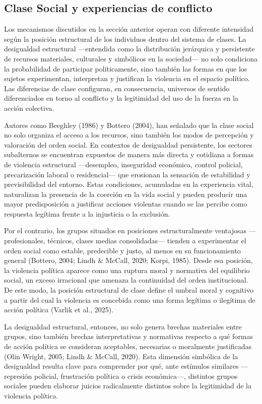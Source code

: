 \documentclass[
  13pt,
]{article}
\begin{document}
\subsection{Clase Social y experiencias de
conflicto}\label{clase-social-y-experiencias-de-conflicto}

Los mecanismos discutidos en la sección anterior operan con diferente
intensidad según la posición estructural de los individuos dentro del
sistema de clases. La desigualdad estructural ---entendida como la
distribución jerárquica y persistente de recursos materiales, culturales
y simbólicos en la sociedad--- no solo condiciona la probabilidad de
participar políticamente, sino también las formas en que los sujetos
experimentan, interpretan y justifican la violencia en el espacio
político. Las diferencias de clase configuran, en consecuencia,
universos de sentido diferenciados en torno al conflicto y la
legitimidad del uso de la fuerza en la acción colectiva.

Autores como Beeghley (1986) y Bottero (2004), han señalado que la clase
social no solo organiza el acceso a los recursos, sino también los modos
de percepción y valoración del orden social. En contextos de desigualdad
persistente, los sectores subalternos se encuentran expuestos de manera
más directa y cotidiana a formas de violencia estructural ---desempleo,
inseguridad económica, control policial, precarización laboral o
residencial--- que erosionan la sensación de estabilidad y
previsibilidad del entorno. Estas condiciones, acumuladas en la
experiencia vital, naturalizan la presencia de la coerción en la vida
social y pueden producir una mayor predisposición a justificar acciones
violentas cuando se las percibe como respuesta legítima frente a la
injusticia o la exclusión.

Por el contrario, los grupos situados en posiciones estructuralmente
ventajosas ---profesionales, técnicos, clases medias consolidadas---
tienden a experimentar el orden social como estable, predecible y justo,
al menos en su funcionamiento general (Bottero, 2004; Lindh \& McCall,
2020; Korpi, 1985). Desde esa posición, la violencia política aparece
como una ruptura moral y normativa del equilibrio social, un exceso
irracional que amenaza la continuidad del orden institucional. De este
modo, la posición estructural de clase define el umbral moral y
cognitivo a partir del cual la violencia es concebida como una forma
legítima o ilegítima de acción política (Varlik et al., 2025).

La desigualdad estructural, entonces, no solo genera brechas materiales
entre grupos, sino también brechas interpretativas y normativas respecto
a qué formas de acción política se consideran aceptables, necesarias o
moralmente justificadas (Olin Wright, 2005; Lindh \& McCall, 2020). Esta
dimensión simbólica de la desigualdad resulta clave para comprender por
qué, ante estímulos similares ---represión policial, frustración
política o crisis económica---, distintos grupos sociales pueden
elaborar juicios radicalmente distintos sobre la legitimidad de la
violencia política.
\end{document}
